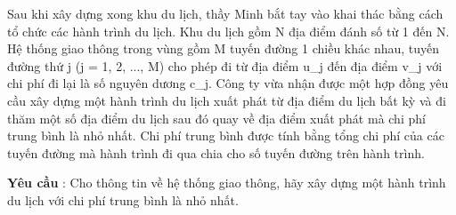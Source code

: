 Sau khi xây dựng xong khu du lịch, thầy Minh bắt tay vào khai thác bằng cách tổ chức các hành trình du lịch. Khu du lịch gồm N địa điểm đánh số từ 1 đến N. Hệ thống giao thông trong vùng gồm M tuyến đường 1 chiều khác nhau, tuyến đường thứ j (j = 1, 2, ..., M) cho phép đi từ địa điểm u\_j đến địa điểm v\_j với chi phí đi lại là số nguyên dương c\_j. Công ty vừa nhận được một hợp đồng yêu cầu xây dựng một hành trình du lịch xuất phát từ địa điểm du lịch bất kỳ và đi thăm một số địa điểm du lịch sau đó quay về địa điểm xuất phát mà chi phí trung bình là nhỏ nhất. Chi phí trung bình được tính bằng tổng chi phí của các tuyến đường mà hành trình đi qua chia cho số tuyến đường trên hành trình.  

\textbf{    Yêu cầu   }   : Cho thông tin về hệ thống giao thông, hãy xây dựng một hành trình du lịch với chi phí trung bình là nhỏ nhất.  

\